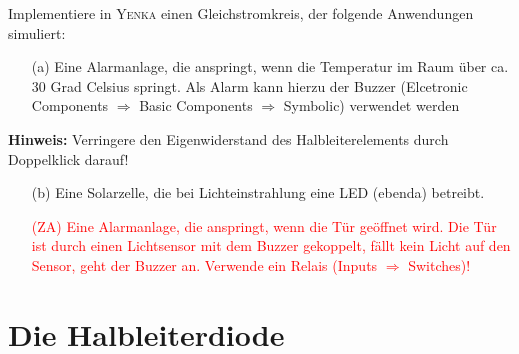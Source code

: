 \begin{Aufgabe} \label{Aufg:SensorSimul}
Implementiere in \textsc{Yenka} einen Gleichstromkreis, der folgende Anwendungen simuliert:
\begin{itemize}
\item[(a)] Eine Alarmanlage, die anspringt, wenn die Temperatur im Raum über ca. 30 Grad Celsius springt. Als Alarm kann hierzu der Buzzer (Elcetronic Components $\Rightarrow$ Basic Components $\Rightarrow$ Symbolic) verwendet werden
\end{itemize}
\textbf{Hinweis:} Verringere den Eigenwiderstand des Halbleiterelements durch Doppelklick darauf!
\begin{itemize}
\item[(b)] Eine Solarzelle, die bei Lichteinstrahlung eine LED (ebenda) betreibt.
\item[\textcolor{red}{(ZA)}] \textcolor{red}{Eine Alarmanlage, die anspringt, wenn die Tür geöffnet wird. Die Tür ist durch einen Lichtsensor mit dem Buzzer gekoppelt, fällt kein Licht auf den Sensor, geht der Buzzer an. Verwende ein Relais (Inputs $\Rightarrow$ Switches)!}
\end{itemize}
\end{Aufgabe}






\section{Die Halbleiterdiode}

